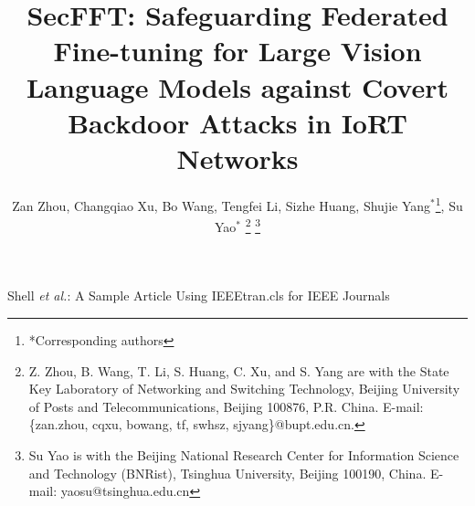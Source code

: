 \documentclass[lettersize,journal]{IEEEtran}
\begin{document}
\title{SecFFT: Safeguarding Federated Fine-tuning for Large Vision Language Models against Covert Backdoor Attacks in IoRT Networks}
 
\author{Zan Zhou, %
  Changqiao Xu, Bo Wang, Tengfei Li, Sizhe Huang, Shujie Yang$^{\ast}$\thanks{*Corresponding authors}, Su Yao$^{\ast}$
\thanks{Z. Zhou, B. Wang, T. Li, S. Huang, C. Xu, and S. Yang are with the State Key Laboratory of Networking and Switching Technology, Beijing University of Posts and Telecommunications, Beijing 100876, P.R. China. E-mail: \{zan.zhou, cqxu, bowang, tf, swhsz, sjyang\}@bupt.edu.cn. 
	}  %
\thanks{Su Yao is with the Beijing National Research Center for Information Science and Technology (BNRist), Tsinghua University, Beijing 100190, China. E-mail: yaosu@tsinghua.edu.cn}%
}

%
{Shell \MakeLowercase{\textit{et al.}}: A Sample Article Using IEEEtran.cls for IEEE Journals}


\maketitle
\end{document}
